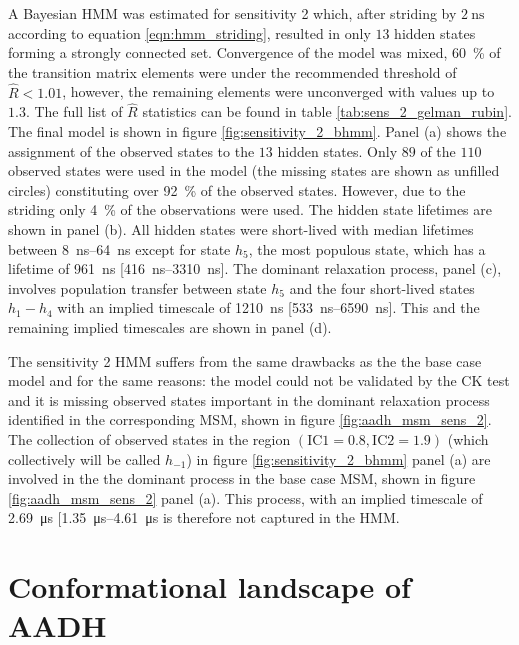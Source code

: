 A Bayesian HMM was estimated for sensitivity 2 which, after striding by  $\SI{2}{\nano\second}$ according to equation \ref{eqn:hmm_striding}, resulted in only $13$ hidden states forming a strongly connected set. Convergence of the model was mixed, \SI{60}{\percent} of the transition matrix elements were under the recommended threshold of $\hat{R}<1.01$,  however, the remaining elements were unconverged with values up to $1.3$. The full list of $\hat{R}$ statistics can be found in table \ref{tab:sens_2_gelman_rubin}. The final model is shown in figure \ref{fig:sensitivity_2_bhmm}. Panel (a) shows the assignment of the observed states to the $13$ hidden states. Only $89$ of the $110$ observed states were used in the model (the missing states are shown as unfilled circles) constituting over \SI{92}{\percent} of the observed states. However, due to the striding only \SI{4}{\percent} of the observations were used. The hidden state lifetimes are shown in panel (b). All hidden states were short-lived with median lifetimes between \SIrange{8}{64}{\nano\second} except for state $h_5$, the most populous state, which has a lifetime of \SI{961}{\nano\second} [\SIrange[range-phrase=\text{--}]{416}{3310}{\nano\second}]. The dominant relaxation process, panel (c), involves population transfer between state $h_{5}$ and the four short-lived states $h_{1} - h_{4}$ with an implied timescale of \SI{1210}{\nano\second} [\SIrange[range-phrase=\text{--}]{533}{6590}{\nano\second}]. This and the remaining implied timescales are shown in panel (d). 

The sensitivity 2 HMM suffers from the same drawbacks as the the base case model and for the same reasons: the model could not be validated by the CK test and it is missing observed states important in the dominant relaxation process identified in the corresponding MSM, shown in figure \ref{fig:aadh_msm_sens_2}. The collection of observed states in the region $(\mathrm{IC 1}=0.8, \mathrm{IC 2}=1.9)$ (which collectively will be called $h_{-1}$) in figure \ref{fig:sensitivity_2_bhmm} panel (a) are involved in the the dominant process in the  base case MSM, shown in figure \ref{fig:aadh_msm_sens_2} panel (a). This process, with an implied timescale of \SI{2.69}{\micro\second} [\SIrange[range-phrase=\text{--}]{1.35}{4.61}{\micro\second} is therefore not captured in the HMM.


\section{Conformational landscape of AADH}\label{sec:aadh_landscape}

